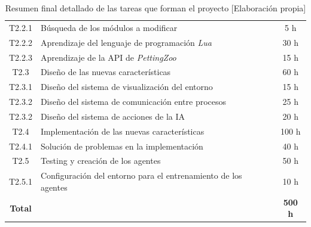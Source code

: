 \begin{table}[h]
\begin{center}
\begin{tabular}{| c | l | c |}
			T2.2.1          & Búsqueda de los módulos a modificar                            & 5 h             \\
			T2.2.2          & Aprendizaje del lenguaje de programación \textit{Lua}                   & 30 h            \\
			T2.2.3          & Aprendizaje de la API de \textit{PettingZoo}                            & 15 h            \\ \hline
			T2.3            & Diseño de las nuevas características                           & 60 h            \\ \hline
			T2.3.1          & Diseño del sistema de visualización del entorno                & 15 h            \\
			T2.3.2          & Diseño del sistema de comunicación entre procesos              & 25 h            \\
			T2.3.2          & Diseño del sistema de acciones de la IA                        & 20 h            \\ \hline
			T2.4            & Implementación de las nuevas características                   & 100 h            \\ \hline
			T2.4.1          & Solución de problemas en la implementación                     & 40 h            \\\hline

			T2.5            & Testing y creación de los agentes                              & 50 h            \\ \hline
			T2.5.1          & Configuración del entorno para el entrenamiento de los agentes & 10 h            \\
			\hline
			\textbf{Total}  &                                                                & \textbf{500 h}  \\
			\hline
		\end{tabular}
		\caption{Resumen final detallado de las tareas que forman el proyecto [Elaboración propia]}
		\label{tab:planificacion-2}
	\end{center}
\end{table}



